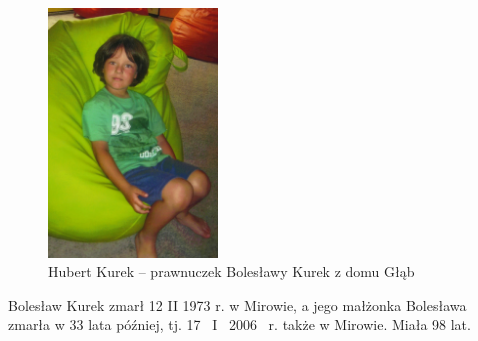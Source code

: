 \begin{figure}[!h]
\begin{center}
\includegraphics[width=0.4\textwidth]{zdjecia/hubert_kurek.jpg}
\caption[Hubert Kurek]{Hubert Kurek -- prawnuczek Bolesławy Kurek z domu Głąb}
\label{rys:hubert_kurek}
\end{center}
\end{figure}

Bolesław Kurek zmarł 12 II 1973 r. w Mirowie, a jego małżonka Bolesława zmarła w 33 lata później, tj. 17~ I ~2006 ~r. także w Mirowie. Miała 98 lat.



